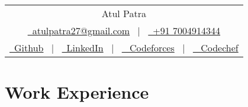 \documentclass[a4paper,10pt]{article}
\begin{document}
\pagestyle{empty} 
\begin{tabularx}{\linewidth}{@{} C @{}}
\Huge{Atul Patra} \\[7.5pt]
\href{mailto:atulpatra27@gmail.com}{\raisebox{-0.05\height} \ atulpatra27@gmail.com} \ $|$ \ 
\href{tel:+91 7004914344}{\raisebox{-0.05\height}\ +91 7004914344} \\
\href{https://github.com/flxcsx}{\raisebox{-0.05\height}\ Github} \ $|$ \ 
\href{https://www.linkedin.com/in/altxt/}{\raisebox{-0.05\height}\ LinkedIn} \ $|$ \ 
\href{https://codeforces.com/profile/altxt}{\raisebox{-0.05\height} \ Codeforces} \ $|$ \ 
\href{https://codechef.com/users/altxt}{\raisebox{-0.05\height} \ Codechef} 
\end{tabularx}
\section{Work Experience}
\end{document}
